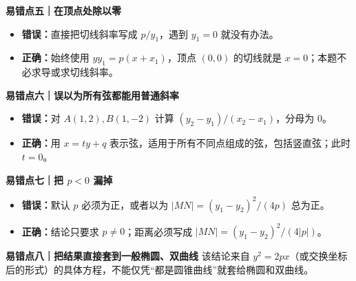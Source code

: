 \begin{trapbox}
\medskip
\textbf{\textcolor{CTrap}{易错点五｜在顶点处除以零}}
\begin{itemize}[leftmargin=*,itemsep=0.25em]
\item \textbf{错误：}直接把切线斜率写成 $p/y_1$，遇到 $y_1=0$ 就没有办法。
\item \textbf{正确：}始终使用 $yy_1=p(x+x_1)$，顶点 $(0,0)$ 的切线就是 $x=0$；本题不必求导或求切线斜率。
\end{itemize}

\medskip
\textbf{\textcolor{CTrap}{易错点六｜误以为所有弦都能用普通斜率}}
\begin{itemize}[leftmargin=*,itemsep=0.25em]
\item \textbf{错误：}对 $A(1,2),B(1,-2)$ 计算 $(y_2-y_1)/(x_2-x_1)$，分母为 $0$。
\item \textbf{正确：}用 $x=ty+q$ 表示弦，适用于所有不同点组成的弦，包括竖直弦；此时 $t=0$。
\end{itemize}

\medskip
\textbf{\textcolor{CTrap}{易错点七｜把 $p<0$ 漏掉}}
\begin{itemize}[leftmargin=*,itemsep=0.25em]
\item \textbf{错误：}默认 $p$ 必须为正，或者以为 $|MN|=(y_1-y_2)^2/(4p)$ 总为正。
\item \textbf{正确：}结论只要求 $p\ne0$；距离必须写成 $|MN|=(y_1-y_2)^2/(4|p|)$。
\end{itemize}

\medskip
\textbf{\textcolor{CTrap}{易错点八｜把结果直接套到一般椭圆、双曲线}}
该结论来自 $y^2=2px$（或交换坐标后的形式）的具体方程，不能仅凭“都是圆锥曲线”就套给椭圆和双曲线。
\end{trapbox}
